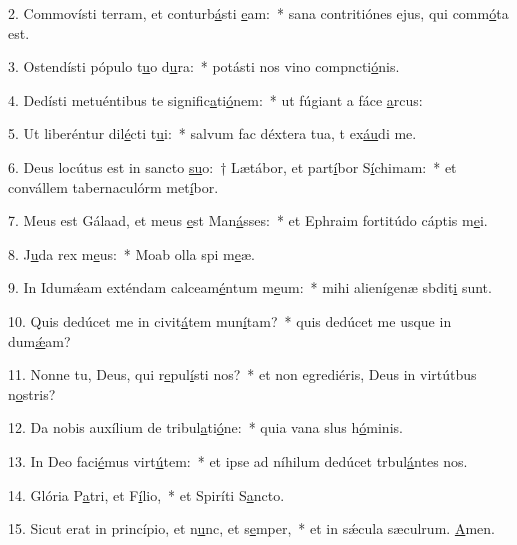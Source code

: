 2. Commovísti terram, et conturb\uline{á}sti \uline{e}am:~* sana contritiónes ejus, qui comm\uline{ó}ta est.\par 
3. Ostendísti pópulo t\uline{u}o d\uline{u}ra:~* potásti nos vino compncti\uline{ó}nis.\par 
4. Dedísti metuéntibus te signific\uline{a}ti\uline{ó}nem:~* ut fúgiant a fáce \uline{a}rcus:\par 
5. Ut liberéntur dil\uline{é}cti t\uline{u}i:~* salvum fac déxtera tua, t ex\uline{áu}di me.\par 
6. Deus locútus est in sancto \uline{su}o:~† Lætábor, et part\uline{í}bor S\uline{í}chimam:~* et convállem tabernaculórm met\uline{í}bor.\par 
7. Meus est Gálaad, et meus \uline{e}st Man\uline{á}sses:~* et Ephraim fortitúdo cáptis m\uline{e}i.\par 
8. J\uline{u}da rex m\uline{e}us:~* Moab olla spi m\uline{e}æ.\par 
9. In Idumǽam exténdam calceam\uline{é}ntum m\uline{e}um:~* mihi alienígenæ sbdit\uline{i} sunt.\par 
10. Quis dedúcet me in civit\uline{á}tem mun\uline{í}tam?~* quis dedúcet me usque in dum\uline{ǽ}am?\par 
11. Nonne tu, Deus, qui r\uline{e}pul\uline{í}sti nos?~* et non egrediéris, Deus in virtútbus n\uline{o}stris?\par 
12. Da nobis auxílium de tribul\uline{a}ti\uline{ó}ne:~* quia vana slus h\uline{ó}minis.\par 
13. In Deo faci\uline{é}mus virt\uline{ú}tem:~* et ipse ad níhilum dedúcet trbul\uline{á}ntes nos.\par 
14. Glória P\uline{a}tri, et F\uline{í}lio,~* et Spiríti S\uline{a}ncto.\par 
15. Sicut erat in princípio, et n\uline{u}nc, et s\uline{e}mper,~* et in sǽcula sæculrum. \uline{A}men.\par 
